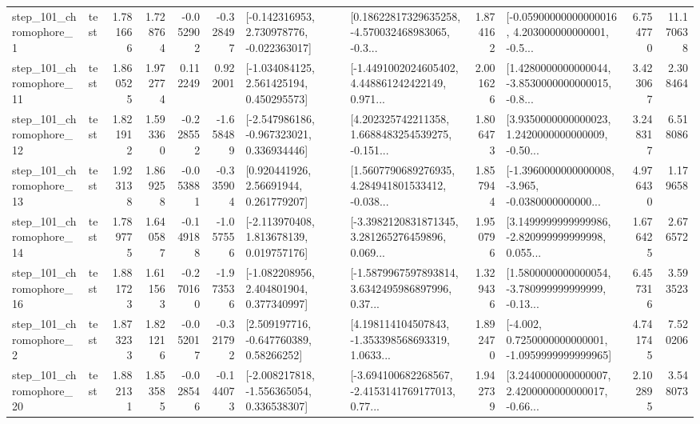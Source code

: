 \begin{tabular}{llrrrrllrlrr}
   step\_101\_chromophore\_1 &      test &      1.781666 &    1.728764 &     -0.052902 & -0.328497 &   [-0.142316953, 2.730978776, -0.022363017] &  [0.18622817329635258, -4.570032468983065, -0.3... &       1.874162 &  [-0.05900000000000016, 4.203000000000001, -0.5... &            6.754770 &         11.170638 \\
  step\_101\_chromophore\_11 &      test &      1.860525 &    1.972774 &      0.112249 &  0.922001 &    [-1.034084125, 2.561425194, 0.450295573] &  [-1.4491002024605402, 4.448861242422149, 0.971... &       2.001626 &  [1.4280000000000044, -3.8530000000000015, -0.8... &            3.423067 &          2.308464 \\
  step\_101\_chromophore\_12 &      test &      1.821912 &    1.593360 &     -0.228552 & -1.658489 &   [-2.547986186, -0.967323021, 0.336934446] &  [4.202325742211358, 1.6688483254539275, -0.151... &       1.806473 &  [3.9350000000000023, 1.2420000000000009, -0.50... &            3.248317 &          6.518086 \\
  step\_101\_chromophore\_13 &      test &      1.923138 &    1.869258 &     -0.053881 & -0.335904 &      [0.920441926, 2.56691944, 0.261779207] &  [1.5607790689276935, 4.284941801533412, -0.038... &       1.857944 &  [-1.3960000000000008, -3.965, -0.0380000000000... &            4.976430 &          1.179658 \\
  step\_101\_chromophore\_14 &      test &      1.789775 &    1.640587 &     -0.149188 & -1.057556 &    [-2.113970408, 1.813678139, 0.019757176] &  [-3.3982120831871345, 3.281265276459896, 0.069... &       1.950796 &  [3.1499999999999986, -2.820999999999998, 0.055... &            1.676425 &          2.676572 \\
  step\_101\_chromophore\_16 &      test &      1.881723 &    1.611563 &     -0.270160 & -1.973536 &    [-1.082208956, 2.404801904, 0.377340997] &  [-1.5879967597893814, 3.6342495986897996, 0.37... &       1.329436 &  [1.5800000000000054, -3.780999999999999, -0.13... &            6.457316 &          3.593523 \\
   step\_101\_chromophore\_2 &      test &      1.873233 &    1.821216 &     -0.052017 & -0.321792 &     [2.509197716, -0.647760389, 0.58266252] &  [4.198114104507843, -1.353398568693319, 1.0633... &       1.892470 &  [-4.002, 0.7250000000000001, -1.0959999999999965] &            4.741745 &          7.520206 \\
  step\_101\_chromophore\_20 &      test &      1.882131 &    1.853585 &     -0.028546 & -0.144073 &   [-2.008217818, -1.556365054, 0.336538307] &  [-3.694100682268567, -2.4153141769177013, 0.77... &       1.942739 &  [3.2440000000000007, 2.4200000000000017, -0.66... &            2.102895 &          3.548073 \\

\end{tabular}
